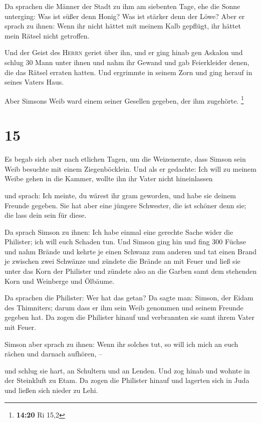  Da sprachen die Männer der Stadt zu ihm am siebenten
Tage, ehe die Sonne unterging: Was ist süßer denn Honig? Was ist stärker
denn der Löwe? Aber er sprach zu ihnen: Wenn ihr nicht hättet mit meinem
Kalb gepflügt, ihr hättet mein Rätsel nicht getroffen.

 Und der Geist des \textsc{Herrn} geriet über ihn, und er
ging hinab gen Askalon und schlug 30 Mann unter ihnen und nahm ihr
Gewand und gab Feierkleider denen, die das Rätsel erraten hatten. Und
ergrimmte in seinem Zorn und ging herauf in seines Vaters Haus.

 Aber Simsons Weib ward einem seiner Gesellen gegeben,
der ihm zugehörte. \footnote{\textbf{14:20} Ri 15,2}

\hypertarget{section-6}{%
\section{15}\label{section-6}}

 Es begab sich aber nach etlichen Tagen, um die
Weizenernte, dass Simson sein Weib besuchte mit einem Ziegenböcklein.
Und als er gedachte: Ich will zu meinem Weibe gehen in die Kammer,
wollte ihn ihr Vater nicht hineinlassen

 und sprach: Ich meinte, du wärest ihr gram geworden, und
habe sie deinem Freunde gegeben. Sie hat aber eine jüngere Schwester,
die ist schöner denn sie; die lass dein sein für diese.

 Da sprach Simson zu ihnen: Ich habe einmal eine gerechte
Sache wider die Philister; ich will euch Schaden tun.  Und
Simson ging hin und fing 300 Füchse und nahm Brände und kehrte je einen
Schwanz zum anderen und tat einen Brand je zwischen zwei Schwänze
 und zündete die Brände an mit Feuer und ließ sie unter
das Korn der Philister und zündete also an die Garben samt dem stehenden
Korn und Weinberge und Ölbäume.

 Da sprachen die Philister: Wer hat das getan? Da sagte
man: Simson, der Eidam des Thimniters; darum dass er ihm sein Weib
genommen und seinem Freunde gegeben hat. Da zogen die Philister hinauf
und verbrannten sie samt ihrem Vater mit Feuer.

 Simson aber sprach zu ihnen: Wenn ihr solches tut, so
will ich mich an euch rächen und darnach aufhören, --

 und schlug sie hart, an Schultern und an Lenden. Und zog
hinab und wohnte in der Steinkluft zu Etam.  Da zogen die
Philister hinauf und lagerten sich in Juda und ließen sich nieder zu
Lehi.


